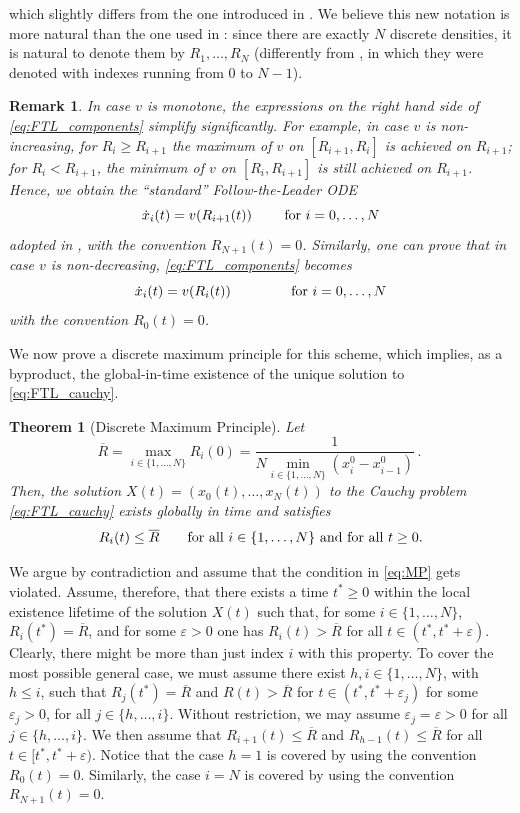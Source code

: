 \documentclass[reqno,oneside]{amsart}
\theoremstyle{plain}
\newtheorem{theorem}{Theorem}[section]
\newtheorem{remark}{Remark}[section]
\begin{document}
which slightly differs from the one introduced in \cite{DR}. We believe this new notation is more natural than the one used in \cite{DR}: since there are exactly $N$ discrete densities, it is natural to denote them by $R_1,\ldots,R_N$ (differently from \cite{DR}, in which they were denoted with indexes running from $0$ to $N-1$).
\begin{remark}
\emph{
    In case $v$ is monotone, the expressions on the right hand side of \eqref{eq:FTL_components} simplify significantly. For example, in case $v$ is non-increasing, for $R_i\geq R_{i+1}$ the maximum of $v$ on $[R_{i+1},R_i]$ is achieved on $R_{i+1}$; for $R_i<R_{i+1}$, the minimum of $v$ on $[R_i,R_{i+1}]$ is still achieved on $R_{i+1}$. Hence, we obtain the \enquote{standard} Follow-the-Leader ODE
    \[\dot{x}_i(t)=v(R_{i+1}(t))\qquad \hbox{ for $i=0,\ldots,N$}\]
    adopted in \cite{DR}, with the convention $R_{N+1}(t)=0$. 
    Similarly, one can prove that in case $v$ is non-decreasing, \eqref{eq:FTL_components} becomes
    \[\dot{x}_i(t)=v(R_i(t))\qquad \qquad \hbox{ for $i=0,\ldots,N$}\]
    with the convention $R_0(t)=0$.
}
\end{remark}

We now prove a discrete maximum principle for this scheme, which implies, as a byproduct, the global-in-time existence of the unique solution to \eqref{eq:FTL_cauchy}.

\begin{theorem}[Discrete Maximum Principle]\label{thm:MP}
    Let 
    \begin{equation}\label{eq:R_bar}
        \overline{R}=\max_{i\in\{1,\ldots,N\}}R_i(0)= \frac{1}{N\min_{i\in\{1,\ldots,N\}}(x_i^0-x_{i-1}^0)}\,.\
    \end{equation}
    Then, the solution $X(t)=(x_0(t),\ldots,x_N(t))$ to the Cauchy problem \eqref{eq:FTL_cauchy} exists globally in time and satisfies
    \begin{equation}\label{eq:MP}
        R_i(t)\leq \overline{R}\qquad \hbox{for all $i\in\{1,\ldots,N\}$ and for all $t\geq 0$}.
    \end{equation}
\end{theorem}

\proof
We argue by contradiction and assume that the condition in \eqref{eq:MP} gets violated. Assume, therefore, that there exists a time $t^*\geq 0$ within the local existence lifetime of the solution $X(t)$ such that, for some $i\in \{1,\ldots,N\}$, $R_i(t^*)=\overline{R}$, and for some $\varepsilon>0$ one has $R_i(t)>\overline{R}$ for all $t\in (t^*,t^*+\varepsilon)$. Clearly, there might be more than just index $i$ with this property. To cover the most possible general case, we must assume there exist $h,i\in \{1,\ldots,N\}$, with $h\leq i$, such that $R_j(t^*)=\overline{R}$ and $R(t)>\overline{R}$ for $t\in(t^*,t^*+\varepsilon_j)$ for some $\varepsilon_j>0$, for all $j\in \{h,\ldots,i\}$. Without restriction, we may assume $\varepsilon_j=\varepsilon>0$ for all $j\in \{h,\ldots,i\}$. We then assume that $R_{i+1}(t)\leq \overline{R}$ and $R_{h-1}(t)\leq \overline{R}$ for all $t\in [t^*,t^*+\varepsilon)$. Notice that the case $h=1$ is covered by using the convention $R_0(t)=0$. Similarly, the case $i=N$ is covered by using the convention $R_{N+1}(t)=0$.
\end{document}
